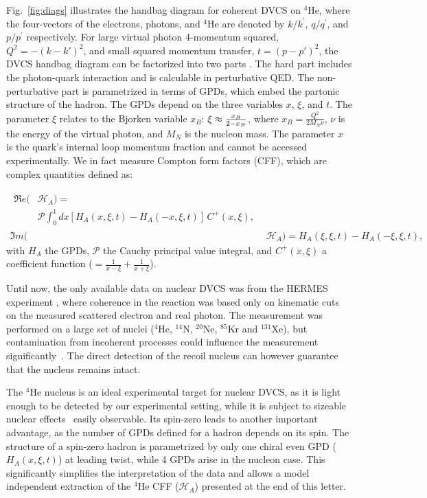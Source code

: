 \documentclass[twocolumn,nofootinbib,showpacs,prl,superscriptaddress,secnumarabic,amssymb,nobibnotes,aps,floatfix]{revtex4}
\begin{document}
Fig.~\ref{fig:diags} illustrates the handbag diagram for coherent DVCS on 
$^4$He, where the four-vectors of the electrons, photons, and $^4$He are denoted 
by $k/k^\prime$, $q/q^\prime$, and $p/p^\prime$ respectively. For large 
virtual photon 4-momentum squared, $Q^2=-(k-k')^{2}$, and small squared 
momentum transfer, $t=(p-p')^{2}$, the DVCS handbag 
diagram can be factorized into two parts \cite{Freund_Collins,Ji_Osborne}. The 
hard part includes the photon-quark interaction and is calculable in 
perturbative QED. The non-perturbative part is parametrized in terms of GPDs, 
which embed the partonic structure of the hadron. The GPDs depend on the three 
variables $x$, $\xi$, and $t$. The 
parameter $\xi$ relates to the Bjorken variable $x_{B}$: $\xi\approx 
{{x_B}\over{2-x_B}}$, where $x_B=\frac{Q^2}{2M_N\nu}$, $\nu$ is the energy of the virtual photon, and 
$M_N$ is the nucleon mass. The parameter $x$ is the quark's internal loop momentum 
fraction and cannot be accessed experimentally. We in fact measure 
Compton form factors (CFF), which are complex quantities defined as:

\begin{align}
\begin{split}
\Re e(&\mathcal{H}_{A}) = \\
    &\mathcal{P} 
\int_{0}^{1}dx[H_A(x,\xi,t)-H_A(-x,\xi,t)] \, C^{+}(x,\xi), 
\end{split} \\
\Im m(&\mathcal{H}_{A}) = H_A(\xi,\xi,t)-H_A(-\xi,\xi,t),
\end{align}
with $H_A$ the GPDs, $\mathcal{P}$ 
the Cauchy principal value integral, and $C^{+}(x,\xi)$ a coefficient function 
($=  \frac{1}{x-\xi} + \frac{1}{x+\xi}$).

Until now, the only available data on nuclear DVCS was from the HERMES 
experiment \cite{Ellinghaus:2002zw}, where coherence in the reaction was based 
only on kinematic cuts on the measured scattered electron and real photon. The 
measurement was performed on a large set of nuclei ($^4$He, $^{14}$N, $^{20}$Ne, $^{85}$Kr and $^{131}$Xe), 
but contamination from incoherent processes could influence the measurement 
significantly~\cite{Guzey:2003jh}. The direct detection of the recoil nucleus 
can however guarantee that the nucleus remains intact. 

The $^4$He nucleus is an ideal experimental target for nuclear DVCS, as it 
is light enough to be detected by our experimental setting, while it is subject to 
sizeable nuclear effects~\cite{JSeely} easily observable. Its spin-zero leads 
to another important advantage, as the number of GPDs defined for a hadron 
depends on its spin. The structure of a spin-zero hadron is parametrized by 
only one chiral even GPD ($H_{A}(x,\xi,t)$) at leading twist, while 4 GPDs 
arise in the nucleon case. This significantly simplifies the interpretation of 
the data and allows a model independent extraction of the $^4$He CFF 
($\mathcal{H}_{A}$) presented at the end of this letter. 
\end{document}
